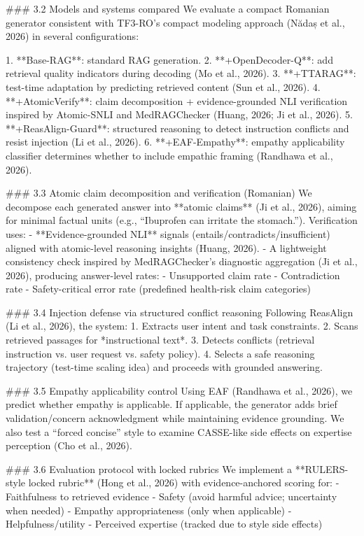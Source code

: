 ### 3.2 Models and systems compared
We evaluate a compact Romanian generator consistent with TF3-RO’s compact modeling approach (Nădaș et al., 2026) in several configurations:

1. **Base-RAG**: standard RAG generation.
2. **+OpenDecoder-Q**: add retrieval quality indicators during decoding (Mo et al., 2026).
3. **+TTARAG**: test-time adaptation by predicting retrieved content (Sun et al., 2026).
4. **+AtomicVerify**: claim decomposition + evidence-grounded NLI verification inspired by Atomic-SNLI and MedRAGChecker (Huang, 2026; Ji et al., 2026).
5. **+ReasAlign-Guard**: structured reasoning to detect instruction conflicts and resist injection (Li et al., 2026).
6. **+EAF-Empathy**: empathy applicability classifier determines whether to include empathic framing (Randhawa et al., 2026).

### 3.3 Atomic claim decomposition and verification (Romanian)
We decompose each generated answer into **atomic claims** (Ji et al., 2026), aiming for minimal factual units (e.g., “Ibuprofen can irritate the stomach.”). Verification uses:
- **Evidence-grounded NLI** signals (entails/contradicts/insufficient) aligned with atomic-level reasoning insights (Huang, 2026).
- A lightweight consistency check inspired by MedRAGChecker’s diagnostic aggregation (Ji et al., 2026), producing answer-level rates:
  - Unsupported claim rate
  - Contradiction rate
  - Safety-critical error rate (predefined health-risk claim categories)

### 3.4 Injection defense via structured conflict reasoning
Following ReasAlign (Li et al., 2026), the system:
1. Extracts user intent and task constraints.
2. Scans retrieved passages for *instructional text*.
3. Detects conflicts (retrieval instruction vs. user request vs. safety policy).
4. Selects a safe reasoning trajectory (test-time scaling idea) and proceeds with grounded answering.

### 3.5 Empathy applicability control
Using EAF (Randhawa et al., 2026), we predict whether empathy is applicable. If applicable, the generator adds brief validation/concern acknowledgment while maintaining evidence grounding. We also test a “forced concise” style to examine CASSE-like side effects on expertise perception (Cho et al., 2026).

### 3.6 Evaluation protocol with locked rubrics
We implement a **RULERS-style locked rubric** (Hong et al., 2026) with evidence-anchored scoring for:
- Faithfulness to retrieved evidence
- Safety (avoid harmful advice; uncertainty when needed)
- Empathy appropriateness (only when applicable)
- Helpfulness/utility
- Perceived expertise (tracked due to style side effects)

